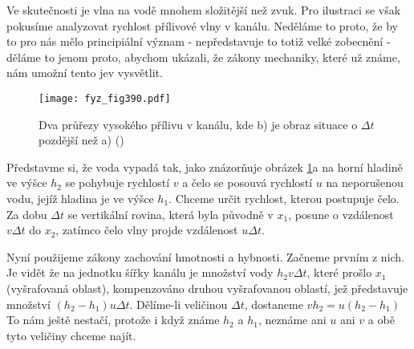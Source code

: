 {  Ve skutečnosti je vlna na vodě mnohem složitější než zvuk. Pro ilustraci se však pokusíme 
  analyzovat rychlost přílivové vlny v kanálu. Neděláme to proto, že by to pro nás mělo 
  principiální význam - nepředstavuje to totiž velké zobecnění - děláme to jenom proto, abychom 
  ukázali, že zákony mechaniky, které už známe, nám umožní tento jev vysvětlit. 
  
  \begin{figure}[ht!] %
    \centering
    \texttt{[image: fyz\_fig390.pdf]}
    \caption{Dva průřezy vysokého přílivu v kanálu, kde b) je obraz situace o \(\Delta t\)
                 pozdější než a)
             (\cite[s.~689]{Feynman01})}
    \label{fyz:fig390}
  \end{figure}
  
  Představme si, že voda vypadá tak, jako znázorňuje obrázek \ref{fyz:fig390}a na horní hladině ve 
  výšce \(h_2\) se pohybuje rychlostí \(v\) a čelo se posouvá rychlostí \(u\) na neporušenou vodu, 
  jejíž hladina je ve výšce \(h_1\). Chceme určit rychlost, kterou postupuje čelo. Za dobu \(\Delta 
  t\) se vertikální rovina, která byla původně v \(x_1\), posune o vzdálenost \(v\Delta t\) do 
  \(x_2\), zatímco čelo vlny projde vzdálenost \(u\Delta t\).
  
  Nyní použijeme zákony zachování hmotnosti a hybnosti. Začneme prvním z nich. Je vidět že na 
  jednotku šířky kanálu je množství vody \(h_2v\Delta t\), které prošlo \(x_1\) (vyšrafovaná 
  oblast), kompenzováno druhou vyšrafovanou oblastí, jež představuje množství \((h_2-h_1)u\Delta 
  t\). Dělíme-li veličinou \(\Delta t\), dostaneme \(vh_2=u(h_2-h_1)\) To nám ještě nestačí, 
  protože i když známe \(h_2\) a \(h_1\), neznáme ani \(u\) ani \(v\) a obě tyto veličiny chceme 
  najít. 
  
}
